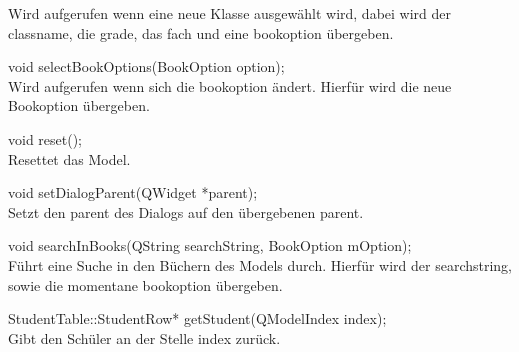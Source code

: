 \begin{description}
    Wird aufgerufen wenn eine neue Klasse ausgewählt wird, dabei wird der classname, die grade, das fach und eine bookoption übergeben.
    \item[ ] void selectBookOptions(BookOption option); \\
    Wird aufgerufen wenn sich die bookoption ändert. Hierfür wird die neue Bookoption übergeben.
    \item[ ] void reset(); \\
    Resettet das Model.
    \item[ ] void setDialogParent(QWidget *parent); \\
    Setzt den parent des Dialogs auf den übergebenen parent.
   	\item[ ] void searchInBooks(QString searchString, BookOption mOption); \\
   	Führt eine Suche in den Büchern des Models durch. Hierfür wird der searchstring, sowie die momentane bookoption übergeben.
    \item[ ] StudentTable::StudentRow* getStudent(QModelIndex index); \\
   	Gibt den Schüler an der Stelle index zurück.
\end{description}

